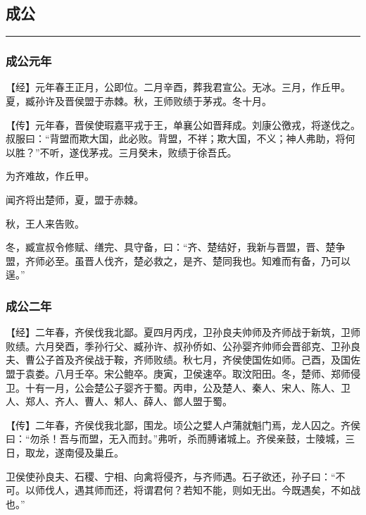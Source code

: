 \documentclass[]{article}
\begin{document}
\hypertarget{header-n1508}{%
\subsection{成公}\label{header-n1508}}

\begin{center}\rule{0.5\linewidth}{\linethickness}\end{center}

\hypertarget{header-n1510}{%
\subsubsection{成公元年}\label{header-n1510}}

【经】元年春王正月，公即位。二月辛酉，葬我君宣公。无冰。三月，作丘甲。夏，臧孙许及晋侯盟于赤棘。秋，王师败绩于茅戎。冬十月。

【传】元年春，晋侯使瑕嘉平戎于王，单襄公如晋拜成。刘康公徼戎，将遂伐之。叔服曰：``背盟而欺大国，此必败。背盟，不祥；欺大国，不义；神人弗助，将何以胜？''不听，遂伐茅戎。三月癸未，败绩于徐吾氏。

为齐难故，作丘甲。

闻齐将出楚师，夏，盟于赤棘。

秋，王人来告败。

冬，臧宣叔令修赋、缮完、具守备，曰：``齐、楚结好，我新与晋盟，晋、楚争盟，齐师必至。虽晋人伐齐，楚必救之，是齐、楚同我也。知难而有备，乃可以逞。''

\hypertarget{header-n1519}{%
\subsubsection{成公二年}\label{header-n1519}}

【经】二年春，齐侯伐我北鄙。夏四月丙戌，卫孙良夫帅师及齐师战于新筑，卫师败绩。六月癸酉，季孙行父、臧孙许、叔孙侨如、公孙婴齐帅师会晋郤克、卫孙良夫、曹公子首及齐侯战于鞍，齐师败绩。秋七月，齐侯使国佐如师。己酉，及国佐盟于袁娄。八月壬卒。宋公鲍卒。庚寅，卫侯速卒。取汶阳田。冬，楚师、郑师侵卫。十有一月，公会楚公子婴齐于蜀。丙申，公及楚人、秦人、宋人、陈人、卫人、郑人、齐人、曹人、邾人、薛人、鄫人盟于蜀。

【传】二年春，齐侯伐我北鄙，围龙。顷公之嬖人卢蒲就魁门焉，龙人囚之。齐侯曰：``勿杀！吾与而盟，无入而封。''弗听，杀而膊诸城上。齐侯亲鼓，士陵城，三日，取龙，遂南侵及巢丘。

卫侯使孙良夫、石稷、宁相、向禽将侵齐，与齐师遇。石子欲还，孙子曰：``不可。以师伐人，遇其师而还，将谓君何？若知不能，则如无出。今既遇矣，不如战也。''
\end{document}
